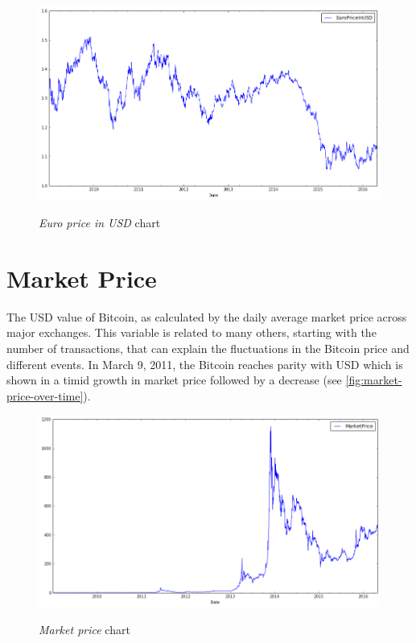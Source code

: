 \begin{figure}[bth]
  \myfloatalign
  {\includegraphics[width=1\linewidth]
    {gfx/euro-price-in-usd-over-time}} 
  \caption{\textit{Euro price in USD} chart}
  \label{fig:euro-price-in-usd-over-time}
\end{figure}


\section{Market Price}
\label{sec:market-price}



The USD value of Bitcoin, as calculated by the daily average market
price across major exchanges. This variable is related to many others,
starting with the number of transactions, that can explain the
fluctuations in the Bitcoin price and different events. In March 9,
2011, the Bitcoin reaches parity with USD which is shown in a timid
growth in market price followed by a decrease (see
\autoref{fig:market-price-over-time}).

\begin{figure}[bth]
  \myfloatalign
  {\includegraphics[width=1\linewidth]
    {gfx/market-price-over-time}}
  \caption{\textit{Market price} chart}
  \label{fig:market-price-over-time}
\end{figure}

